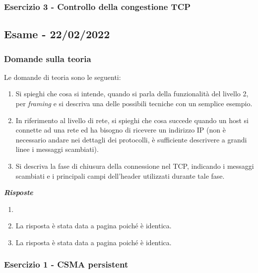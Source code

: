 \documentclass[a4paper]{article}
\begin{document}
	\subsubsection{Esercizio 3 - Controllo della congestione TCP}
	
	\newpage

	\subsection[\textbf{Esame - 22/02/2022}]{Esame - 22/02/2022}
	
	\subsubsection{Domande sulla teoria}
	Le domande di teoria sono le seguenti:
	\begin{enumerate}
		\item Si spieghi che cosa si intende, quando si parla della funzionalità del livello 2, per \emph{framing} e si descriva una delle possibili tecniche con un semplice esempio.
		
		\item In riferimento al livello di rete, si spieghi che cosa succede quando un host si connette ad una rete ed ha bisogno di ricevere un indirizzo IP (non è necessario andare nei dettagli dei protocolli, è sufficiente descrivere a grandi linee i messaggi scambiati).
		
		\item Si descriva la fase di chiusura della connessione nel TCP, indicando i messaggi scambiati e i principali campi dell'header utilizzati durante tale fase.
	\end{enumerate}
	\textcolor{Green4}{\textbf{\emph{Risposte}}}
	\begin{enumerate}
		\item 
		
		\item La risposta è stata data a pagina \pageref{DHCP} poiché è identica.
		
		\item La risposta è stata data a pagina \pageref{TCP chiusura connessione} poiché è identica.
	\end{enumerate}
	
	\subsubsection{Esercizio 1 - CSMA persistent}
	
\end{document}
